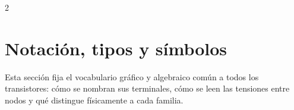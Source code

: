 \documentclass[11pt,a4paper]{article}
\begin{document}
	\begin{multicols}{2}
		\small
		\renewcommand{\contentsname}{Índice}
		\tableofcontents
	\end{multicols}

	\section{Notación, tipos y símbolos}

	Esta sección fija el vocabulario gráfico y algebraico común a todos los transistores: cómo se nombran sus terminales, cómo se leen las tensiones entre nodos y qué distingue físicamente a cada familia.
\end{document}
